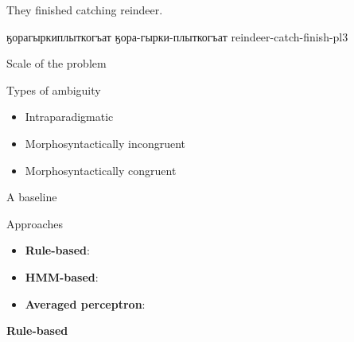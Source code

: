 \documentclass{beamer}
\begin{document}
\begin{frame}

They finished catching reindeer.

ӄорагыркиплыткогъат
ӄора-гырки-плыткогъат
reindeer-catch-finish-{\sc pl3}

\end{frame}

\begin{frame}{Scale of the problem}

\end{frame}

\begin{frame}{Types of ambiguity}

\begin{itemize}
  \item Intraparadigmatic
  \item Morphosyntactically incongruent
  \item Morphosyntactically congruent
\end{itemize}

\end{frame}

\begin{frame}{A baseline}

\end{frame}




\begin{frame}{Approaches}

\begin{itemize}
   \item \textbf{Rule-based}:
   \item \textbf{HMM-based}:
   \item \textbf{Averaged perceptron}:
\end{itemize}

\end{frame}

\begin{frame}
\centering
{\LARGE {\bf Rule-based } }
\end{frame}
\end{document}
